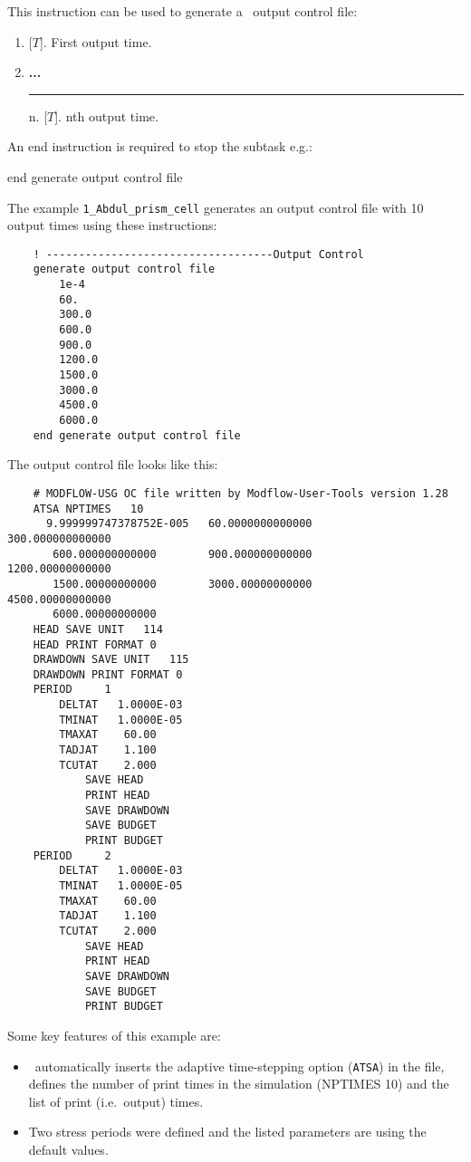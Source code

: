 \label{section:OutputControl}
This instruction can be used to generate a \mfus\ output control file:

    {
    \squish
    \begin{enumerate}
    \item {} [$T$].  First output time.
    \item \textbf{...} \\
     \hspace*{-.27in}\rule{0.in}{.24in}  n.  [$T$].  nth output time.
    \end{enumerate}

    An end instruction is required to stop the subtask e.g.:

    {\Large \sf end generate output control file}
    }

The  example \texttt{1\_Abdul\_prism\_cell} generates an output control file with 10 output times using these instructions:
\begin{verbatim}
    ! -----------------------------------Output Control
    generate output control file
        1e-4
        60.
        300.0
        600.0
        900.0
        1200.0
        1500.0
        3000.0
        4500.0
        6000.0
    end generate output control file
\end{verbatim}

The output control file looks like this:
\begin{verbatim}
    # MODFLOW-USG OC file written by Modflow-User-Tools version 1.28
    ATSA NPTIMES   10
      9.999999747378752E-005   60.0000000000000        300.000000000000
       600.000000000000        900.000000000000        1200.00000000000
       1500.00000000000        3000.00000000000        4500.00000000000
       6000.00000000000
    HEAD SAVE UNIT   114
    HEAD PRINT FORMAT 0
    DRAWDOWN SAVE UNIT   115
    DRAWDOWN PRINT FORMAT 0
    PERIOD     1
        DELTAT   1.0000E-03
        TMINAT   1.0000E-05
        TMAXAT    60.00
        TADJAT    1.100
        TCUTAT    2.000
            SAVE HEAD
            PRINT HEAD
            SAVE DRAWDOWN
            SAVE BUDGET
            PRINT BUDGET
    PERIOD     2
        DELTAT   1.0000E-03
        TMINAT   1.0000E-05
        TMAXAT    60.00
        TADJAT    1.100
        TCUTAT    2.000
            SAVE HEAD
            PRINT HEAD
            SAVE DRAWDOWN
            SAVE BUDGET
            PRINT BUDGET
\end{verbatim}

Some key features of this example are:
\begin{itemize}
    \item \mut\ automatically inserts  the  adaptive time-stepping option (\texttt{ATSA}) in the file, defines the number of print times in the simulation (NPTIMES 10) and the list of print (i.e.\ output) times.
    \item Two stress periods were defined and the listed parameters are using the default values.
\end{itemize}


